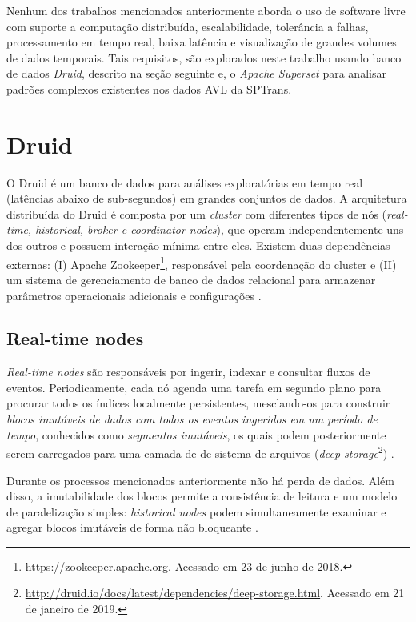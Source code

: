 \documentclass[
	12pt,				%
	oneside,			%
	a4paper,			%
	english,			%
	brazil				%
	]{abntex2ppgsi}
\begin{document}
{{{Nenhum dos trabalhos mencionados anteriormente aborda o uso de software livre com suporte a computação distribuída, escalabilidade, tolerância a falhas, processamento em tempo real, baixa latência e visualização de grandes volumes de dados temporais. Tais requisitos, são explorados neste trabalho usando banco de dados \textit{Druid}, descrito na seção seguinte e, o \textit{Apache Superset} para analisar padrões complexos existentes nos dados AVL da SPTrans.

\section{Druid}
\label{druid}

O Druid é um banco de dados para análises exploratórias em tempo real (latências abaixo de sub-segundos) em grandes conjuntos de dados. A arquitetura distribuída do Druid é composta por um \textit{cluster} com diferentes tipos de nós (\textit{real-time, historical, broker e coordinator nodes}), que operam independentemente uns dos outros e possuem interação mínima entre eles. Existem duas dependências externas: (I) Apache Zookeeper\footnote{\url{https://zookeeper.apache.org}. Acessado em 23 de junho de 2018.}, responsável pela coordenação do cluster e (II) um sistema de gerenciamento de banco de dados relacional  para armazenar parâmetros operacionais adicionais e configurações \cite{yang2014druid}.

\subsection{Real-time nodes}

\textit {Real-time nodes} são responsáveis por ingerir, indexar e consultar fluxos de eventos. Periodicamente, cada nó agenda uma tarefa em segundo plano para procurar todos os índices localmente persistentes, mesclando-os para construir \emph{blocos imutáveis de dados com todos os eventos ingeridos em um período de tempo}, conhecidos como \emph{segmentos imutáveis}, os quais podem posteriormente serem carregados para uma camada de de sistema de arquivos (\textit{deep storage}\footnote{\url{http://druid.io/docs/latest/dependencies/deep-storage.html}. Acessado em 21 de janeiro de 2019.}) \cite{yang2014druid}.

Durante os processos mencionados anteriormente não há perda de dados. Além disso, a imutabilidade dos blocos permite a consistência de leitura e um modelo de paralelização simples: \textit{historical nodes} podem simultaneamente examinar e agregar blocos imutáveis de forma não bloqueante \cite{yang2014druid}.

}}}
\end{document}
